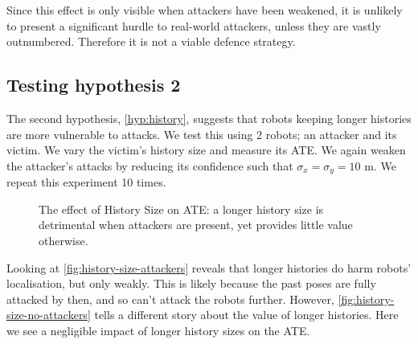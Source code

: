Since this effect is only visible when attackers have been weakened, it is unlikely to present a significant hurdle to real-world attackers, unless they are vastly outnumbered. Therefore it is not a viable defence strategy.

\subsection{Testing hypothesis 2}
The second hypothesis, \ref{hyp:history}, suggests that robots keeping longer histories are more vulnerable to attacks. We test this using 2 robots; an attacker and its victim. We vary the victim's history size and measure its ATE. We again weaken the attacker's attacks by reducing its confidence such that $\sigma_x = \sigma_y = 10$ m. We repeat this experiment 10 times.

\begin{figure}[!h]
	\centering
	\caption{The effect of History Size on ATE: a longer history size is detrimental when attackers are present, yet provides little value otherwise.}
\end{figure}

Looking at \ref{fig:history-size-attackers} reveals that longer histories do harm robots' localisation, but only weakly. This is likely because the past poses are fully attacked by then, and so can't attack the robots further. However, \ref{fig:history-size-no-attackers} tells a different story about the value of longer histories. Here we see a negligible impact of longer history sizes on the ATE.

